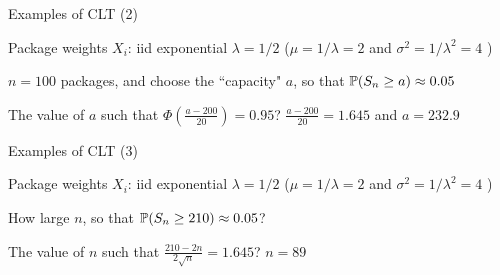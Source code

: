 \begin{frame}{Examples of CLT (2)}


\plitemsep 0.1in
\bci
\item Package weights $X_i$: iid exponential $\lambda=1/2$ ($\mu = 1/\lambda = 2$ and $\sigma^2 = 1/\lambda^2 = 4$ )

\item<2-> $n = 100$ packages, and choose the ``capacity" $a$, so that $\mathbb{P}( S_n \geq a ) \approx 0.05$

\item<4-> The value of $a$ such that $\Phi(\frac{a-200}{20}) = 0.95$? $\frac{a-200}{20} = 1.645$ and $a = 232.9$
\eci

\end{frame}

\begin{frame}{Examples of CLT (3)}


\plitemsep 0.1in
\bci
\item Package weights $X_i$: iid exponential $\lambda=1/2$ ($\mu = 1/\lambda = 2$ and $\sigma^2 = 1/\lambda^2 = 4$ )

\item<2-> How large $n$, so that $\mathbb{P}( S_n \geq 210 ) \approx 0.05$?

\item<4-> The value of $n$ such that $\frac{210-2n}{2\sqrt{n}} = 1.645$? $n = 89$
\eci

\end{frame}




